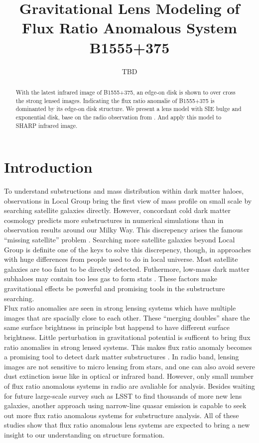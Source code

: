 \documentclass[manuscript]{emulateapj}
\begin{document}
\title{Gravitational Lens Modeling of Flux Ratio Anomalous System B1555+375}
\author{TBD}

\begin{abstract}
With the latest infrared image of B1555+375, an edge-on disk is shown to over cross the strong lensed images. Indicating the flux ratio anomalie of B1555+375 is dominanted by its edge-on disk structure. We present a lens model with SIE bulge and exponential disk, base on the radio observation from \citet{Marlow}. And apply this model to SHARP infrared image.

\end{abstract}


\section{Introduction}
	To understand substructions and mass distribution within dark matter haloes, observations in Local Group bring the first view of mass profile on small scale by searching satellite galaxies directly. However, concordant cold dark matter cosmology predicts more substructures in numerical simulations than in observation results around our Milky Way. This discrepency arises the famous ``missing satellite'' problem \citep{Klypin1999, Moore1999, S07}. Searching more satellite galaxies beyond Local Group is definite one of the keys to solve this discrepency, though, in approaches with huge differences from people used to do in local universe. Most satellite galaxies are too faint to be directly detected. Futhermore, low-mass dark matter subhaloes may contain too less gas to form stats \citep{P11}. These factors make gravitational effects be powerful and promising tools in the substructure searching.\\   
	Flux ratio anomalies are seen in strong lensing systems which have multiple images that are spacially close to each other. These ``merging doubles'' share the same surface brightness in principle but happend to have different surface brightness. Little perturbation in gravitational potential is sufficent to bring flux ratio anomalies in strong lensed systems. This makes flux ratio anomaly becomes a promising tool to detect dark matter substructures \citep{Dalal2002, N13}. In radio band, lensing images are not sensitive to micro lensing from stars, and one can also avoid severe dust extinction issue like in optical or infrared band. However, only small number of flux ratio anomalous systems in radio are avaliable for analysis. Besides waiting for future large-scale survey such as LSST to find thousands of more new lens galaxies, another approach using narrow-line quasar emission \citep{N14} is capable to seek out more flux ratio anomalous systems for substructure analysis. All of these studies show that flux ratio anomalous lens systems are expected to bring a new insight to our understanding on structure formation.\\
\end{document}
